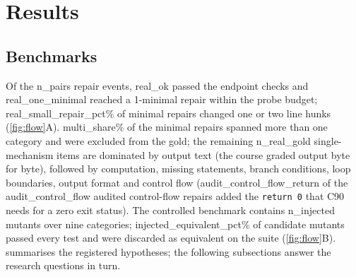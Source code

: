 \section{Results}\label{sec:results}

\subsection{Benchmarks}
Of the {{n_pairs}} repair events, {{real_ok}} passed the endpoint checks and {{real_one_minimal}} reached a 1-minimal repair within the probe budget; {{real_small_repair_pct}}\% of minimal repairs changed one or two line hunks (\cref{fig:flow}A). {{multi_share}}\% of the minimal repairs spanned more than one category and were excluded from the gold; the remaining {{n_real_gold}} single-mechanism items are dominated by output text (the course graded output byte for byte), followed by computation, missing statements, branch conditions, loop boundaries, output format and control flow ({{audit_control_flow_return}} of the {{audit_control_flow}} audited control-flow repairs added the \texttt{return 0} that C90 needs for a zero exit status). The controlled benchmark contains {{n_injected}} mutants over nine categories; {{injected_equivalent_pct}}\% of candidate mutants passed every test and were discarded as equivalent on the suite (\cref{fig:flow}B).  summarises the registered hypotheses; the following subsections answer the research questions in turn.

\begin{table}[t]
\centering
\caption{Registered hypotheses: mean difference over cohorts, 95\% bootstrap interval and verdict (H1a reports the mean outcome ceiling itself). H2 and H3 are reported for K-means and HAC.}\label{tab:hyp}
\small
{}
\end{table}


